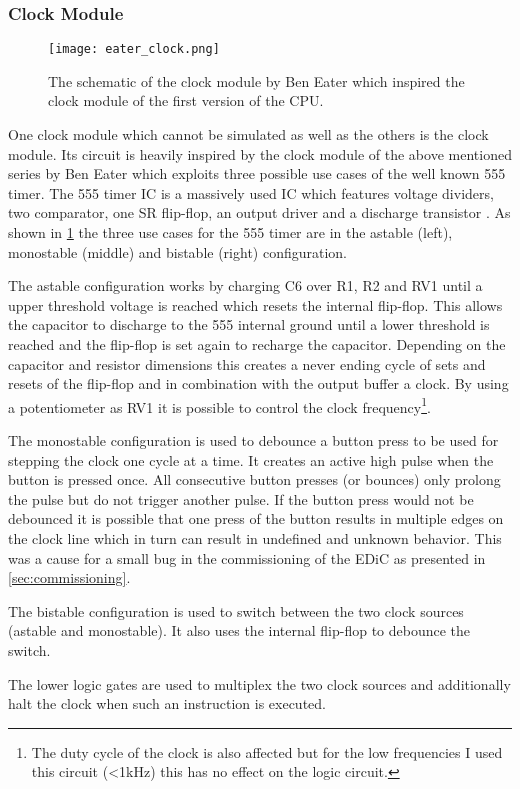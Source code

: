 \subsubsection{Clock Module}
\begin{figure}[t]
  \centering
  \texttt{[image: eater\_clock.png]}
  \caption{The schematic of the clock module by Ben Eater \cite{eater_clock} which inspired the clock module of the first version of the \gls{CPU}.}
  \label{fig:eater_clock}
\end{figure}
One clock module which cannot be simulated as well as the others is the clock module.
Its circuit is heavily inspired by the clock module of the above mentioned series by Ben Eater \cite{eater_clock} which exploits three possible use cases of the well known 555 timer.
The 555 timer \gls{IC} is a massively used \gls{IC} which features voltage dividers, two comparator, one SR flip-flop, an output driver and a discharge transistor \cite{LoweDoug555}.
As shown in \cref{fig:eater_clock} the three use cases for the 555 timer are in the astable (left), monostable (middle) and bistable (right) configuration.

The astable configuration works by charging C6 over R1, R2 and RV1 until a upper threshold voltage is reached which resets the internal flip-flop.
This allows the capacitor to discharge to the 555 internal ground until a lower threshold is reached and the flip-flop is set again to recharge the capacitor.
Depending on the capacitor and resistor dimensions this creates a never ending cycle of sets and resets of the flip-flop and in combination with the output buffer a clock.
By using a potentiometer as RV1 it is possible to control the clock frequency\footnote{The duty cycle of the clock is also affected but for the low frequencies I used this circuit (<1kHz) this has no effect on the logic circuit.}.

The monostable configuration is used to debounce a button press to be used for stepping the clock one cycle at a time.
It creates an active high pulse when the button is pressed once. All consecutive button presses (or bounces) only prolong the pulse but do not trigger another pulse.
If the button press would not be debounced it is possible that one press of the button results in multiple edges on the clock line which in turn can result in undefined and unknown behavior.
This was a cause for a small bug in the commissioning of the \gls{EDiC} as presented in \cref{sec:commissioning}.

The bistable configuration is used to switch between the two clock sources (astable and monostable).
It also uses the internal flip-flop to debounce the switch.

The lower logic gates are used to multiplex the two clock sources and additionally halt the clock when such an instruction is executed.
